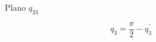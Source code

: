 \documentclass[a4paper,12pt]{article}
\begin{document}
\begin{figure}[H]
    \centering
    \begin{adjustbox}{max width=\columnwidth}
    \end{adjustbox}
    \caption{Plano $q_{23}$}
    \label{q23}
\end{figure}

\begin{equation}
    q_3= \frac{\pi}{2} - q_3^{\prime}
    \label{q3 q3prima}
\end{equation}






\end{document}
